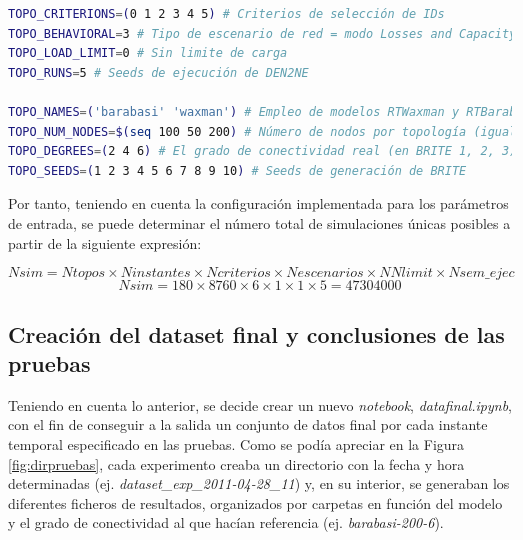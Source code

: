 \vspace{3mm}

\begin{lstlisting}[language=bash, style=Consola, caption={Configuración de los parámetros de entrada en el script de automatización de \acrshort{den2ne}}]
TOPO_CRITERIONS=(0 1 2 3 4 5) # Criterios de selección de IDs
TOPO_BEHAVIORAL=3 # Tipo de escenario de red = modo Losses and Capacity (3)         
TOPO_LOAD_LIMIT=0 # Sin limite de carga
TOPO_RUNS=5 # Seeds de ejecución de DEN2NE

TOPO_NAMES=('barabasi' 'waxman') # Empleo de modelos RTWaxman y RTBarabasi (igual que BRITE)
TOPO_NUM_NODES=$(seq 100 50 200) # Número de nodos por topología (igual que BRITE)
TOPO_DEGREES=(2 4 6) # El grado de conectividad real (en BRITE 1, 2, 3)
TOPO_SEEDS=(1 2 3 4 5 6 7 8 9 10) # Seeds de generación de BRITE
\end{lstlisting}

\vspace{3mm}

Por tanto, teniendo en cuenta la configuración implementada para los parámetros de entrada, se puede determinar el número total de simulaciones únicas posibles a partir de la siguiente expresión:

    \[\textit{Nsim} = \textit{Ntopos} \times \textit{Ninstantes} \times \textit{Ncriterios} 
    \times \textit{Nescenarios} \times \textit{NNlimit} \times \textit{Nsem\_ejec}\]
    \[\textit{Nsim} = 180 \times 8760 \times 6 \times 1 \times 1 \times 5 = 47304000\] 












\subsection{Creación del dataset final y conclusiones de las pruebas}
\label{sec:datasetfinal}




  



Teniendo en cuenta lo anterior, se decide crear un nuevo \textit{notebook}, \textit{datafinal.ipynb}, con el fin de conseguir a la salida un conjunto de datos final por cada instante temporal especificado en las pruebas. Como se podía apreciar en la Figura \ref{fig:dirpruebas}, cada experimento creaba un directorio con la fecha y hora determinadas (ej. \textit{dataset\_exp\_2011-04-28\_11}) y, en su interior, se generaban los diferentes ficheros de resultados, organizados por carpetas en función del modelo y el grado de conectividad al que hacían referencia (ej. \textit{barabasi-200-6}). 

